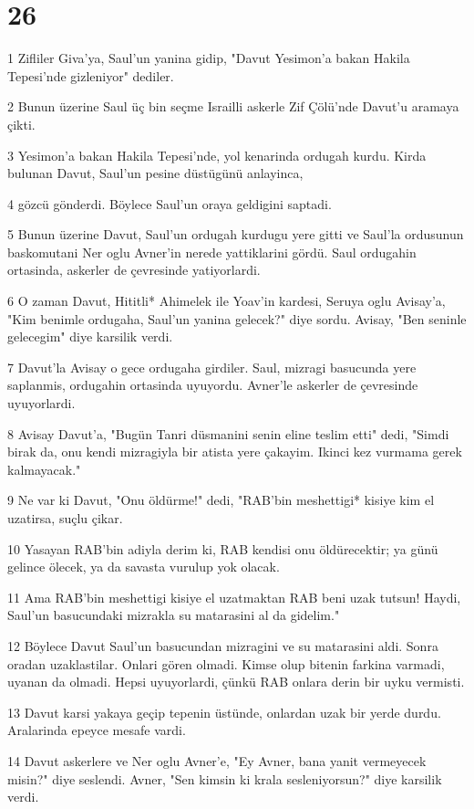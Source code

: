 \chapter{26}

\par 1 Zifliler Giva'ya, Saul'un yanina gidip, "Davut Yesimon'a bakan Hakila Tepesi'nde gizleniyor" dediler.
\par 2 Bunun üzerine Saul üç bin seçme Israilli askerle Zif Çölü'nde Davut'u aramaya çikti.
\par 3 Yesimon'a bakan Hakila Tepesi'nde, yol kenarinda ordugah kurdu. Kirda bulunan Davut, Saul'un pesine düstügünü anlayinca,
\par 4 gözcü gönderdi. Böylece Saul'un oraya geldigini saptadi.
\par 5 Bunun üzerine Davut, Saul'un ordugah kurdugu yere gitti ve Saul'la ordusunun baskomutani Ner oglu Avner'in nerede yattiklarini gördü. Saul ordugahin ortasinda, askerler de çevresinde yatiyorlardi.
\par 6 O zaman Davut, Hititli* Ahimelek ile Yoav'in kardesi, Seruya oglu Avisay'a, "Kim benimle ordugaha, Saul'un yanina gelecek?" diye sordu. Avisay, "Ben seninle gelecegim" diye karsilik verdi.
\par 7 Davut'la Avisay o gece ordugaha girdiler. Saul, mizragi basucunda yere saplanmis, ordugahin ortasinda uyuyordu. Avner'le askerler de çevresinde uyuyorlardi.
\par 8 Avisay Davut'a, "Bugün Tanri düsmanini senin eline teslim etti" dedi, "Simdi birak da, onu kendi mizragiyla bir atista yere çakayim. Ikinci kez vurmama gerek kalmayacak."
\par 9 Ne var ki Davut, "Onu öldürme!" dedi, "RAB'bin meshettigi* kisiye kim el uzatirsa, suçlu çikar.
\par 10 Yasayan RAB'bin adiyla derim ki, RAB kendisi onu öldürecektir; ya günü gelince ölecek, ya da savasta vurulup yok olacak.
\par 11 Ama RAB'bin meshettigi kisiye el uzatmaktan RAB beni uzak tutsun! Haydi, Saul'un basucundaki mizrakla su matarasini al da gidelim."
\par 12 Böylece Davut Saul'un basucundan mizragini ve su matarasini aldi. Sonra oradan uzaklastilar. Onlari gören olmadi. Kimse olup bitenin farkina varmadi, uyanan da olmadi. Hepsi uyuyorlardi, çünkü RAB onlara derin bir uyku vermisti.
\par 13 Davut karsi yakaya geçip tepenin üstünde, onlardan uzak bir yerde durdu. Aralarinda epeyce mesafe vardi.
\par 14 Davut askerlere ve Ner oglu Avner'e, "Ey Avner, bana yanit vermeyecek misin?" diye seslendi. Avner, "Sen kimsin ki krala sesleniyorsun?" diye karsilik verdi.
